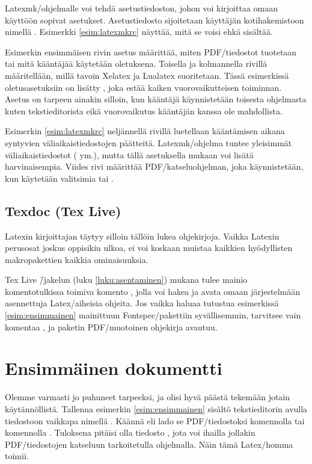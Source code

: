 Latexmk\-/ohjelmalle voi tehdä asetustiedoston, johon voi kirjoittaa
omaan käyttöön sopivat asetukset. Asetustiedosto sijoitetaan käyttäjän
kotihakemistoon nimellä . Esimerkki
\ref{esim:latexmkrc} näyttää, mitä se voisi ehkä sisältää.

Esimerkin ensimmäisen rivin asetus määrittää, miten PDF\-/tiedostot
tuotetaan tai mitä kääntäjää käytetään oletuksena. Toisella ja
kolmannella rivillä määritellään, millä tavoin Xelatex ja Lualatex
suoritetaan. Tässä esimerkissä oletus\-asetuksiin on lisätty
, joka estää kaiken vuorovaikutteisen toiminnan.
Asetus on tarpeen ainakin silloin, kun kääntäjä käynnistetään toisesta
ohjelmasta kuten tekstieditorista eikä vuorovaikutus kääntäjän kanssa
ole mahdollista.



Esimerkin \ref{esim:latexmkrc} neljännellä rivillä luetellaan
kääntämisen aikana syntyvien väliaikaistiedostojen päätteitä.
Latexmk\-/ohjelma tuntee yleisimmät väliaikaistiedostot ( ym.), mutta tällä asetuksella mukaan voi lisätä
harvinaisempia. Viides rivi määrittää PDF\-/katseluohjelman, joka
käynnistetään, kun käytetään valitsimia  tai
.

\subsection{Texdoc (Tex Live)}

Latexin kirjoittajan täytyy silloin tällöin lukea ohjekirjoja. Vaikka
Latexin perus\-osat joskus oppisikin ulkoa, ei voi koskaan muistaa
kaikkien hyödyllisten makropakettien kaikkia ominaisuuksia.

Tex Live \=/jakelun (luku \ref{luku:asentaminen}) mukana tulee mainio
komentotulkissa toimiva komento , jolla voi hakea ja avata
omaan järjestelmään asennettuja Latex\-/aiheisia ohjeita. Jos vaikka
haluaa tutustua esimerkissä \ref{esim:ensimmainen} mainittuun
Fontspec\-/pakettiin syvällisemmin, tarvitsee vain komentaa
, ja paketin PDF\-/muotoinen ohjekirja avautuu.

\section{Ensimmäinen dokumentti}

Olemme varmasti jo puhuneet tarpeeksi, ja olisi hyvä päästä tekemään
jotain käytännöllistä. Tallenna esimerkin \ref{esim:ensimmainen} sisältö
tekstieditorin avulla tiedostoon vaikkapa nimellä .
Käännä eli lado se PDF\-/tiedostoksi komennolla  tai komennolla . Tuloksena
pitäisi olla tiedosto , jota voi ihailla jollakin
PDF\-/tiedostojen katseluun tarkoitetulla ohjelmalla. Näin tämä
Latex\-/homma toimii.

